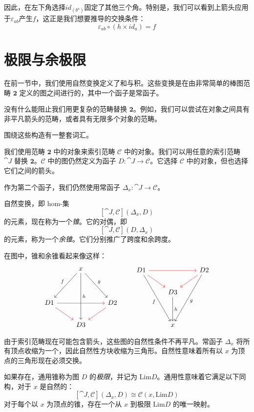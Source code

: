 \documentclass[DaoFP]{subfiles}
\begin{document}
因此，在左下角选择$id_{(b^a)}$固定了其他三个角。特别是，我们可以看到上箭头应用于$\varepsilon_{a b}$产生$f$，这正是我们想要推导的交换条件：
\[ \varepsilon_{a b} \circ (h \times id_a) = f \]

\section{极限与余极限}

在前一节中，我们使用自然变换定义了和与积。这些变换是在由非常简单的棒图范畴 $\mathbf{2}$ 定义的图之间进行的，其中一个函子是常函子。

没有什么能阻止我们用更复杂的范畴替换 $\mathbf{2}$。例如，我们可以尝试在对象之间具有非平凡箭头的范畴，或者具有无限多个对象的范畴。

围绕这些构造有一整套词汇。

我们使用范畴 $\mathbf{2}$ 中的对象来索引范畴 $\mathcal{C}$ 中的对象。我们可以用任意的索引范畴 $\cat J$ 替换 $\mathbf{2}$。$\mathcal{C}$ 中的图仍然定义为函子 $D \colon \cat J \to \mathcal{C}$。它选择 $\mathcal{C}$ 中的对象，但也选择它们之间的箭头。

作为第二个函子，我们仍然使用常函子 $\Delta_x \colon \cat J \to \mathcal{C}$。

自然变换，即 hom-集
\[ [\cat J, \mathcal{C}](\Delta_x, D)  \]
的元素，现在称为一个\emph{锥}。它的对偶，即
\[ [\cat J, \mathcal{C}](D, \Delta_x)  \]
的元素，称为一个\emph{余锥}。它们分别推广了跨度和余跨度。

在图中，锥和余锥看起来像这样：
\[
 \begin{tikzcd}
  & x
\arrow[ddr, "g"]
 \arrow[ddl, "f"']
 \arrow[ddd, "h"]
 \\
\\
D 1 
\arrow[rr, red]
\arrow[rd, red]
&& D 2
\arrow[dl, red]
\\
& D 3
 \end{tikzcd}
 \qquad
\begin{tikzcd}
 D 1
 \arrow[rr, red]
 \arrow[dr, red]
 \arrow[dddr, "f"']
 && D 2
\arrow[dl, red]
 \arrow[dddl, "g"]
 \\
 & D 3
 \arrow[dd, "h"]
 \\
 \\
 & x
 \end{tikzcd}
 \]

由于索引范畴现在可能包含箭头，这些图的自然性条件不再平凡。常函子 $\Delta_x$ 将所有顶点收缩为一个，因此自然性方块收缩为三角形。自然性意味着所有以 $x$ 为顶点的三角形现在必须交换。

如果存在，通用锥称为图 $D$ 的\emph{极限}，并记为 $\text{Lim}D$。通用性意味着它满足以下同构，对于 $x$ 是自然的：
\[ [\cat J, \mathcal{C}](\Delta_x, D)  \cong \mathcal{C}(x, \text{Lim}D) \]
对于每个以 $x$ 为顶点的锥，存在一个从 $x$ 到极限 $ \text{Lim}D$ 的唯一映射。
\end{document}
